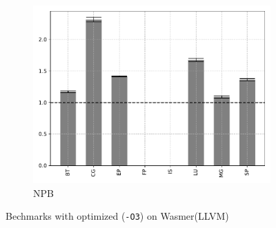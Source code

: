 \begin{figure}
\begin{subfigure}[t]{.45\textwidth}
        \includegraphics[width=\textwidth]
        {Images/6.1.RQ1/npb-wasmer-llvm-opt.pdf}
        \caption{NPB}
    \end{subfigure}
    \caption{Bechmarks with optimized (\texttt{-O3}) on Wasmer(LLVM)}
    \label{fig:rq1-wasmer-llvm-opt}
\end{figure}

